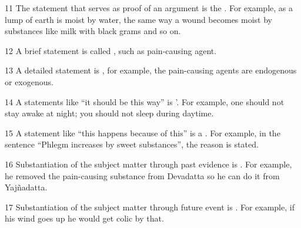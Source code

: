 \begin{translation}
\item [11] The statement that serves as proof of an argument is the 
. For example, as a lump of earth is moist by water, the 
same way a wound becomes moist by substances like milk with black grams and 
so on.  

\item [12] A brief statement is called , such as 
 {pain-causing agent}. 

\item [13] A detailed statement is , for example, the 
pain-causing agents are endogenous or exogenous. 

\item [14] A statements like ``it should be this way'' is 
'. For example, one should not stay awake at night; 
you should not sleep during daytime.  

\item [15] A statement like “this happens because of this” is a 
. For example, in the sentence “Phlegm 
increases by sweet substances”, the reason is stated.  

\item [16] Substantiation of the subject matter through past evidence is 
. For example, he removed the pain-causing substance 
from Devadatta so he can do it from Yajñadatta. 

\item [17] Substantiation of the subject matter through future event is 
. For example, if his wind goes up he would get colic by 
that.  



\end{translation}
